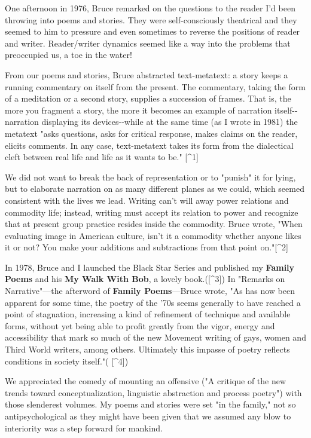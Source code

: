 One afternoon in 1976, Bruce remarked on the questions to the reader I'd
been throwing into poems and stories. They were self-consciously
theatrical and they seemed to him to pressure and even sometimes to
reverse the positions of reader and writer. Reader/writer dynamics
seemed like a way into the problems that preoccupied us, a toe in the
water!

From our poems and stories, Bruce abstracted text-metatext: a story
keeps a running commentary on itself from the present. The commentary,
taking the form of a meditation or a second story, supplies a succession
of frames. That is, the more you fragment a story, the more it becomes
an example of narration itself-\/-narration displaying its
devices-\/-while at the same time (as I wrote in 1981) the metatext
"asks questions, asks for critical response, makes claims on the reader,
elicits comments. In any case, text-metatext takes its form from the
dialectical cleft between real life and life as it wants to be."
{[}\^{}1{]}

We did not want to break the back of representation or to "punish" it
for lying, but to elaborate narration on as many different planes as we
could, which seemed consistent with the lives we lead. Writing can't
will away power relations and commodity life; instead, writing must
accept its relation to power and recognize that at present group
practice resides inside the commodity. Bruce wrote, "When evaluating
image in American culture, isn't it a commodity whether anyone likes it
or not? You make your additions and subtractions from that point
on."{[}\^{}2{]}

In 1978, Bruce and I launched the Black Star Series and published my
\textbf{Family Poems} and his \textbf{My Walk With Bob}, a lovely
book.({[}\^{}3{]}) In "Remarks on Narrative"---the afterword of
\textbf{Family Poems}---Bruce wrote, "As has now been apparent for some
time, the poetry of the '70s seems generally to have reached a point of
stagnation, increasing a kind of refinement of technique and available
forms, without yet being able to profit greatly from the vigor, energy
and accessibility that mark so much of the new Movement writing of gays,
women and Third World writers, among others. Ultimately this impasse of
poetry reflects conditions in society itself."( {[}\^{}4{]})

We appreciated the comedy of mounting an offensive ("A critique of the
new trends toward conceptualization, linguistic abstraction and process
poetry") with those slenderest volumes. My poems and stories were set
"in the family," not so antipsychological as they might have been given
that we assumed any blow to interiority was a step forward for mankind.

